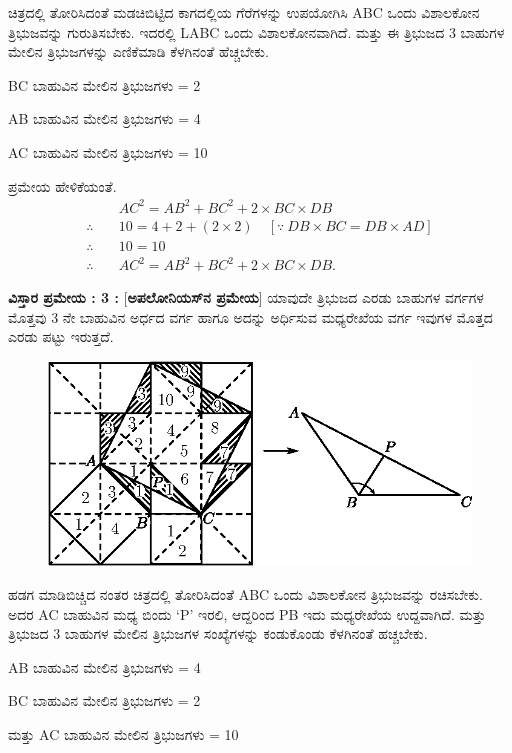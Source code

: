 ಚಿತ್ರದಲ್ಲಿ ತೋರಿಸಿದಂತೆ ಮಡಚಿಬಿಟ್ಟಿದ ಕಾಗದಲ್ಲಿಯ ಗೆರೆಗಳನ್ನು ಉಪಯೋಗಿಸಿ ABC ಒಂದು ವಿಶಾಲಕೋನ ತ್ರಿಭುಜವನ್ನು ಗುರುತಿಸಬೇಕು. ಇದರಲ್ಲಿ LABC ಒಂದು ವಿಶಾಲಕೋನವಾಗಿದೆ. ಮತ್ತು ಈ ತ್ರಿಭುಜದ 3 ಬಾಹುಗಳ ಮೇಲಿನ ತ್ರಿಭುಜಗಳನ್ನು ಎಣಿಕೆಮಾಡಿ ಕೆಳಗಿನಂತೆ ಹೆಚ್ಚಬೇಕು.

BC ಬಾಹುವಿನ ಮೇಲಿನ ತ್ರಿಭುಜಗಳು = 2

AB ಬಾಹುವಿನ ಮೇಲಿನ ತ್ರಿಭುಜಗಳು = 4

AC ಬಾಹುವಿನ ಮೇಲಿನ ತ್ರಿಭುಜಗಳು = 10

ಪ್ರಮೇಯ ಹೇಳಿಕೆಯಂತೆ. 
\begin{align*}
& AC^2  = AB^2 + BC^2 +  2 \times BC \times DB\\
\therefore \quad & 10  = 4 +2  + (2 \times 2) \quad [\because ~ DB \times BC = DB \times AD]\\
\therefore \quad & 10  = 10\\
\therefore \quad & AC^2  = AB^2 + BC^2 + 2 \times BC \times DB.
\end{align*}


\noindent
\textbf{ವಿಸ್ತಾರ ಪ್ರಮೇಯ : 3 :} [\textbf{ಅಪಲೋನಿಯಸ್‌ನ ಪ್ರಮೇಯ}]
ಯಾವುದೇ ತ್ರಿಭುಜದ ಎರಡು ಬಾಹುಗಳ ವರ್ಗಗಳ ಮೊತ್ತವು 3 ನೇ ಬಾಹುವಿನ ಅರ್ಧದ ವರ್ಗ ಹಾಗೂ ಅದನ್ನು ಅರ್ಧಿಸುವ ಮಧ್ಯರೇಖೆಯ ವರ್ಗ ಇವುಗಳ ಮೊತ್ತದ ಎರಡು ಪಟ್ಟು ಇರುತ್ತದೆ. 
\begin{figure}[H]
\centering
\includegraphics[scale=.98]{src/figure/chap1/fig1-17h.eps}
\end{figure}

ಹಡಗ ಮಾಡಿಬಿಚ್ಚಿದ ನಂತರ ಚಿತ್ರದಲ್ಲಿ ತೋರಿಸಿದಂತೆ ABC ಒಂದು ವಿಶಾಲಕೋನ  ತ್ರಿಭುಜವನ್ನು ರಚಿಸಬೇಕು. ಅದರ AC ಬಾಹುವಿನ ಮಧ್ಯ ಬಿಂದು  `P' ಇರಲಿ, ಆದ್ದರಿಂದ  PB ಇದು ಮಧ್ಯರೇಖೆಯ ಉದ್ದವಾಗಿದೆ. ಮತ್ತು ತ್ರಿಭುಜದ 3 ಬಾಹುಗಳ ಮೇಲಿನ ತ್ರಿಭುಜಗಳ ಸಂಖ್ಯೆಗಳನ್ನು ಕಂಡುಕೊಂಡು ಕೆಳಗಿನಂತೆ ಹಚ್ಚಬೇಕು. 

AB ಬಾಹುವಿನ ಮೇಲಿನ ತ್ರಿಭುಜಗಳು = 4

BC ಬಾಹುವಿನ ಮೇಲಿನ ತ್ರಿಭುಜಗಳು = 2

ಮತ್ತು AC ಬಾಹುವಿನ ಮೇಲಿನ ತ್ರಿಭುಜಗಳು = 10

